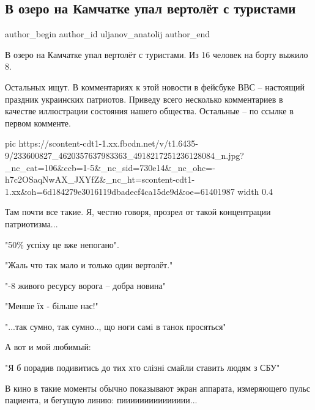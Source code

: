 
 
 
 
 
 
\subsection{В озеро на Камчатке упал вертолёт с туристами}
\label{sec:13_08_2021.fb.uljanov_anatolij.1.kamchatka_katastrofa}
 
\ifcmt
 author_begin
   author_id uljanov_anatolij
 author_end
\fi

В озеро на Камчатке упал вертолёт с туристами. Из 16 человек на борту выжило 8.

Остальных ищут. В комментариях к этой новости в фейсбуке ВВС – настоящий
праздник украинских патриотов. Приведу всего несколько комментариев в качестве
иллюстрации состояния нашего общества. Остальные – по ссылке в первом комменте.

\ifcmt
  pic https://scontent-cdt1-1.xx.fbcdn.net/v/t1.6435-9/233600827_4620357637983363_4918217251236128084_n.jpg?_nc_cat=106&ccb=1-5&_nc_sid=730e14&_nc_ohc=-h7c2OSaqNwAX_JXYfZ&_nc_ht=scontent-cdt1-1.xx&oh=6d184279e3016119dbadecf4ca15de9d&oe=61401987
  width 0.4
\fi

Там почти все такие. Я, честно говоря, прозрел от такой концентрации
патриотизма...

"50\% успіху це вже непогано".

"Жаль что так мало и только один вертолёт."

"-8 живого ресурсу ворога – добра новина"

"Менше їх - більше нас!"

"...так сумно, так сумно.., що ноги самі в танок просяться"

А вот и мой любимый:

"Я б порадив подивитись до тих хто слізні смайли ставить людям з СБУ"

В кино в такие моменты обычно показывают экран аппарата, измеряющего пульс
пациента, и бегущую линию: пиииииииииииииии...

